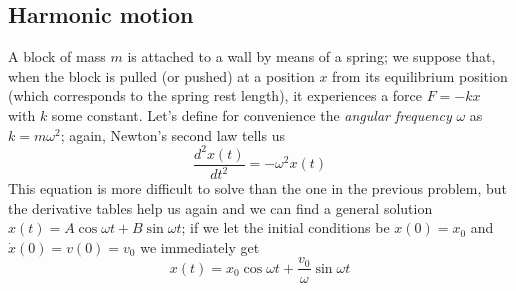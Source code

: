 \subsection{Harmonic motion}
A block of mass $m$ is attached to a wall by means of a spring; we suppose that, when the block is pulled (or pushed) at a position $x$ from its equilibrium position (which corresponds to the spring rest length), it experiences a force $F=-kx$ with $k$ some constant. Let's define for convenience the \textit{angular frequency} $\omega$ as $k=m\omega^2$; again, Newton's second law tells us
\begin{equation}
\label{simpleharmonic}
\frac{d^2x(t)}{dt^2}=-\omega^2 x(t)
\end{equation}
This equation is more difficult to solve than the one in the previous problem, but the derivative tables help us again and we can find a general solution $x(t)=A\cos{\omega t}+B\sin{\omega t}$; if we let the initial conditions be $x(0)=x_0$ and $\dot{x}(0)=v(0)=v_0$ we immediately get
\begin{equation}
x(t)=x_0\cos{\omega t} + \frac{v_0}{\omega}\sin{\omega t}
\end{equation}
